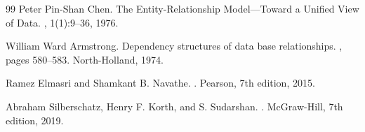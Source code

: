 \documentclass[12pt,a4paper,oneside]{report}
\theoremstyle{definition}
\begin{document}











{}
\begin{thebibliography}{99}
Peter Pin-Shan Chen.
\newblock The Entity-Relationship Model---Toward a Unified View of Data.
, 1(1):9--36, 1976.

William Ward Armstrong.
\newblock Dependency structures of data base relationships.
, pages 580--583. North-Holland, 1974.

Ramez Elmasri and Shamkant B. Navathe.
.
\newblock Pearson, 7th edition, 2015.

Abraham Silberschatz, Henry F. Korth, and S. Sudarshan.
.
\newblock McGraw-Hill, 7th edition, 2019.
\end{thebibliography}
\end{document}
